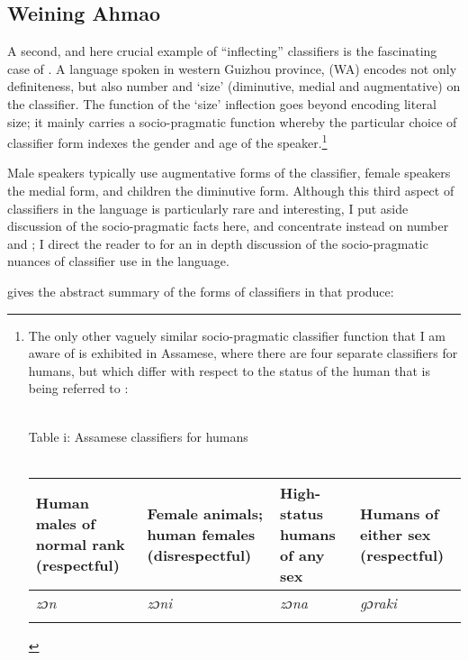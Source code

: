 \documentclass[output=paper
,modfonts
,nonflat]{langsci/langscibook}
\begin{document}
\subsection{Weining Ahmao} \label{sec:hall:4.2}

A second, and here crucial example of ``inflecting'' classifiers is the fascinating case of  \citep{GernerBisang2008,GernerBisang2010}. A  language spoken in western Guizhou province,  (WA) encodes not only definiteness, but also number and `size' (diminutive, medial and augmentative) on the classifier. The function of the `size' inflection goes beyond encoding literal size; it mainly carries a socio-pragmatic function whereby the particular choice of classifier form indexes the gender and age of the speaker.\footnote{The only other vaguely similar socio-pragmatic classifier function that I am aware of is exhibited in Assamese, where there are four separate classifiers for humans, but which differ with respect to the status of the human that is being referred to \citep[102--103]{Aikhenvald2000}:

{\centering 
~\\	
Table i: Assamese classifiers for humans\\ ~ \\
\begin{tabularx}{0.96\textwidth}{XXXX}
\lsptoprule
{\scriptsize Human males of normal rank (respectful)} & {\scriptsize Female animals; human females (disrespectful)} & {\scriptsize High-status humans of any sex} &{\scriptsize Humans of either sex (respectful)}\\
\midrule
\textit{zɔn}&\textit{zɔni}&\textit{zɔna}&\textit{gɔraki}\\
\lspbottomrule
\end{tabularx}}
}

Male speakers typically use augmentative forms of the classifier, female speakers the medial form, and children the diminutive form. Although this third aspect of classifiers in the language is particularly rare and interesting, I put aside discussion of the socio-pragmatic facts here, and concentrate instead on number and ; I direct the reader to \citep{GernerBisang2008,GernerBisang2010} for an in depth discussion of the socio-pragmatic nuances of classifier use in the language.

 gives the abstract summary of the forms of classifiers in  that \citet[721]{GernerBisang2008} produce:
\end{document}
